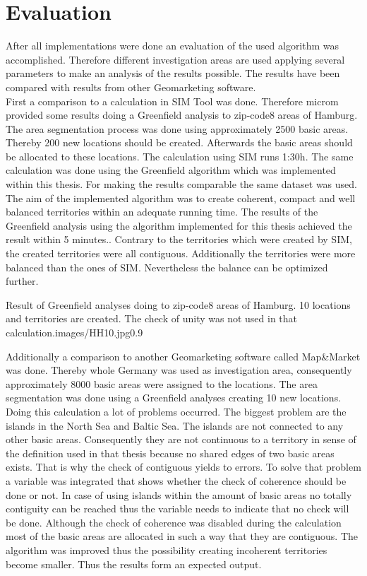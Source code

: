 \section{Evaluation}\label{evaluation}

After all implementations were done an evaluation of the used algorithm was accomplished. Therefore different investigation areas are used applying several parameters to make an analysis of the results possible. The results have been compared with results from other Geomarketing software. \\
First a comparison to a calculation in SIM Tool was done. Therefore microm provided some results doing a Greenfield analysis to zip-code8 areas of Hamburg. The area segmentation process was done using approximately 2500 basic areas. Thereby 200 new locations should be created. Afterwards the basic areas should be allocated to these locations. The calculation using SIM runs 1:30h. The same calculation was done using the Greenfield algorithm which was implemented within this thesis. For making the results comparable the same dataset was used. The aim of the implemented algorithm was to create coherent, compact and well balanced territories within an adequate running time. The results of the Greenfield analysis using the algorithm implemented for this thesis achieved the result within 5 minutes.. Contrary to the territories which were created by SIM, the created territories were all contiguous. Additionally the territories were more balanced than the ones of SIM. Nevertheless the balance can be optimized further.

\begin{figurevarSize}{Result of Greenfield analyses doing to zip-code8 areas of Hamburg. 10 locations and territories are created. The check of unity was not used in that calculation.}{images/HH10.jpg}{0.9}\end{figurevarSize}


Additionally a comparison to another Geomarketing software called Map\&Market was done. Thereby whole Germany was used as investigation area, consequently approximately 8000 basic areas were assigned to the locations. The area segmentation was done using a Greenfield analyses creating 10 new locations. Doing this calculation a lot of problems occurred. The biggest problem are the islands in the North Sea and Baltic Sea. The islands are not connected to any other basic areas. Consequently they are not continuous to a territory in sense of the definition used in that thesis because no shared edges of two basic areas exists. That is why the check of contiguous yields to errors. To solve that problem a variable was integrated that shows whether the check of coherence should be done or not. In case of using islands within the amount of basic areas no totally contiguity can be reached thus the variable needs to indicate that no check will be done. Although the check of coherence was disabled during the calculation most of the basic areas are allocated in such a way that they are contiguous. The algorithm was improved thus the possibility creating incoherent territories become smaller. Thus the results form an expected output. 


